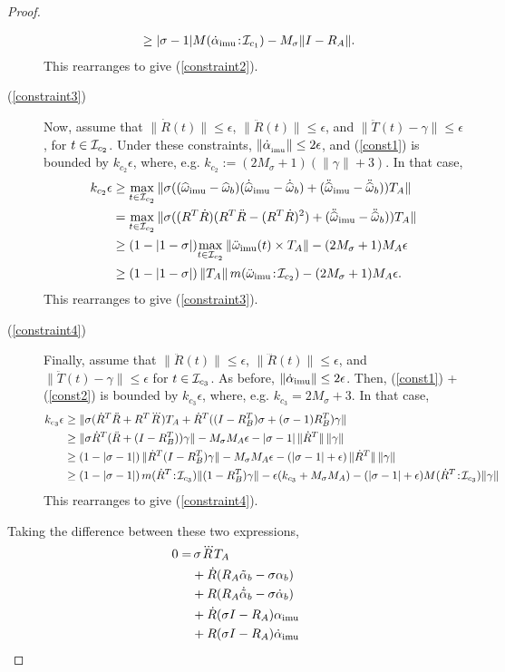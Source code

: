 \begin{proof}
\begin{description}
\begin{align*}
&\geq |\sigma-1|{M}(\dot\alpha_\mathrm{imu}\!:\!{\mathcal{I}_{c_1}}) - M_\sigma\|I-R_A\|.
\end{align*}
This rearranges to give (\ref{constraint2}). 
\item[(\ref{constraint3})]
Now, assume that
$\|\dot R(t)\|\leq\epsilon$, $\|\ddot R(t)\|\leq\epsilon$, and
$\|\ddot T(t) - \gamma\|\leq\epsilon$, for $t\in\mathcal{I}_{c_2}$.  Under these constraints, $\|\dot\alpha_{_\mathrm{imu}}\|\leq2\epsilon$, and
(\ref{const1}) is bounded by $k_{c_2}\epsilon$, where, e.g. $k_{c_2}:=(2M_\sigma+1)(\|\gamma\| + 3)$.
In that case,
\begin{align*}
 k_{c_2}\epsilon&\geq\max_{t\in\mathcal{I}_{c_2}}\|\sigma (({\widehat{\omega}}_\mathrm{imu}-{\widehat{\omega}}_b)(\dot{{\widehat{\omega}}}_\mathrm{imu}-\dot{{\widehat{\omega}}}_b) + (\ddot{{\widehat{\omega}}}_\mathrm{imu}-\ddot{{\widehat{\omega}}}_b)) T_A\|\\
 &=\max_{t\in\mathcal{I}_{c_2}}\|\sigma ((R^T\dot R)(R^T\ddot R - (R^T\dot R)^2) + (\ddot{{\widehat{\omega}}}_\mathrm{imu}-\ddot{{\widehat{\omega}}}_b)) T_A\|\\
 &\geq (1-|1-\sigma|)\!\max_{t\in\mathcal{I}_{c_2}}\|\ddot{\omega}_\mathrm{imu}(t)\times T_A\| - (2M_\sigma+1) M_A\epsilon\\
 &\geq (1-|1-\sigma|)\,\|T_A\|\,{m}(\ddot{\omega}_\mathrm{imu}\!:\!{\mathcal{I}_{c_2}}) - (2M_\sigma+1) M_A\epsilon.
\end{align*}
This rearranges to give (\ref{constraint3}).
\item[(\ref{constraint4})]
Finally, assume that $\|\ddot R(t)\|\leq\epsilon$, $\|\dddot R(t)\|\leq\epsilon$, and $\|\ddot T(t) - \gamma\|\leq\epsilon$
for $t\in\mathcal{I}_{c_3}$.
As before, $\|\dot\alpha_\mathrm{imu}\|\leq2\epsilon$.  Then, (\ref{const1}) + (\ref{const2}) is bounded by $k_{c_3}\epsilon$, where, e.g. $k_{c_3}=2M_\sigma+3$.
In that case,
\begin{align*}
k_{c_3}\epsilon &\geq
   \|\sigma(\dot R^T\ddot R + R^T\dddot R)T_A
  + \dot R^T((I-R_B^T)\sigma + (\sigma-1)R_B^T)\gamma\|\\
&\geq \|\sigma \dot R^T (\ddot R + (I-R^T_B))\gamma\| - M_\sigma M_A\epsilon - |\sigma-1|\,\|\dot R^T\|\,\|\gamma\|\\
&\geq (1-|\sigma-1|)\,\|\dot R^T (I-R^T_B)\gamma\| - M_\sigma M_A\epsilon - (|\sigma-1|+\epsilon)\,\|\dot R^T\|\,\|\gamma\|\\
&\geq (1-|\sigma-1|)\,{m}(\dot R^T\!:\!\mathcal{I}_{c_3})\|(1-R_B^T)\gamma\|
- \epsilon(k_{c_3} + M_\sigma M_A) - (|\sigma-1|+\epsilon){M}(\dot R^T\!:\!\mathcal{I}_{c_3})\|\gamma\|
\end{align*}
This rearranges to give (\ref{constraint4}).
\end{description}
\iffalse
Taking the difference between these two expressions,
\begin{align*}
 0 = &\,\sigma\dddot R T_A \\
 &+ \dot R(R_A\tilde\alpha_b - \sigma\alpha_b)\\
 &+ R(R_A\dot{\tilde\alpha}_b - \sigma\dot\alpha_b)\\
 &+ \dot R(\sigma I - R_A)\alpha_\mathrm{imu}\\
 &+ R(\sigma I - R_A)\dot\alpha_\mathrm{imu}
\end{align*}



\end{proof}
